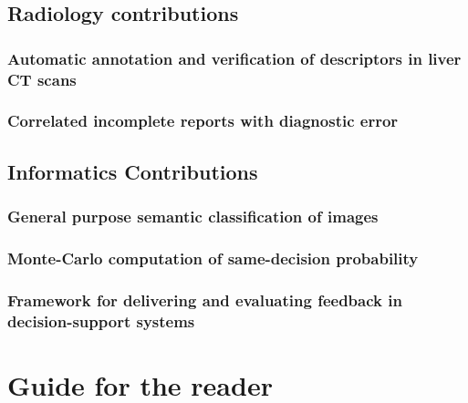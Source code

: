 \subsection{Radiology contributions}
\subsubsection{Automatic annotation and verification of descriptors in liver CT scans}
\subsubsection{Correlated incomplete reports with diagnostic error}

\subsection{Informatics Contributions}
\subsubsection{General purpose semantic classification of images}
\subsubsection{Monte-Carlo computation of same-decision probability}
\subsubsection{Framework for delivering and evaluating feedback in decision-support systems}


\section{Guide for the reader}
